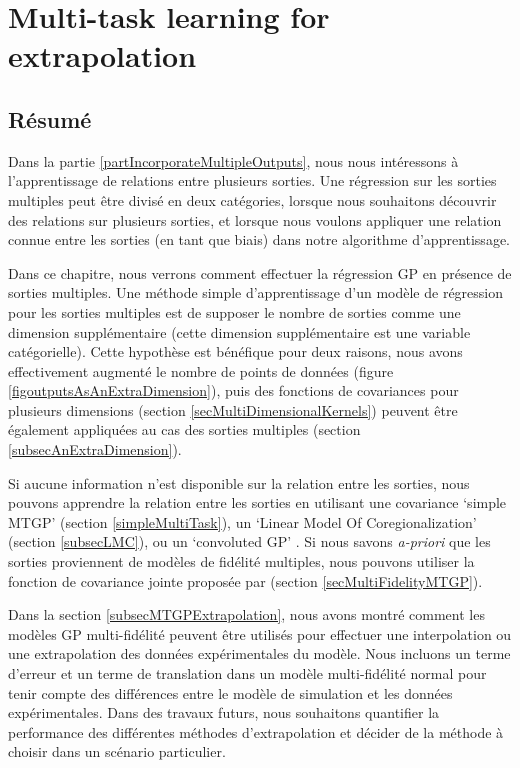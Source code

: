 \chapter{Multi-task learning for extrapolation}
\label{chapMultiTaskExtrapolation}

\begin{mdframed}[hidealllines=true,backgroundcolor=lightgray!20]
\section*{Résumé}
Dans la partie \ref{partIncorporateMultipleOutputs}, nous nous intéressons à l'apprentissage de relations entre plusieurs sorties. Une régression sur les sorties multiples peut être divisé en deux catégories, lorsque nous souhaitons découvrir des relations sur plusieurs sorties, et lorsque nous voulons appliquer une relation connue entre les sorties (en tant que biais) dans notre algorithme d'apprentissage.

Dans ce chapitre, nous verrons comment effectuer la régression GP en présence de sorties multiples. Une méthode simple d'apprentissage d'un modèle de régression pour les sorties multiples est de supposer le nombre de sorties comme une dimension supplémentaire (cette dimension supplémentaire est une variable catégorielle). Cette hypothèse est bénéfique pour deux raisons, nous avons effectivement augmenté le nombre de points de données (figure \ref{figoutputsAsAnExtraDimension}), puis des fonctions de covariances pour plusieurs dimensions (section \ref{secMultiDimensionalKernels}) peuvent être également appliquées au cas des sorties multiples (section \ref{subsecAnExtraDimension}).

Si aucune information n'est disponible sur la relation entre les sorties, nous pouvons apprendre la relation entre les sorties en utilisant une covariance `simple MTGP’ (section \ref{simpleMultiTask}), un `Linear Model Of Coregionalization' (section \ref{subsecLMC}), ou un `convoluted GP’ \cite{alvarez2011kernels}. Si nous savons \textit{a-priori} que les sorties proviennent de modèles de fidélité multiples, nous pouvons utiliser la fonction de covariance jointe proposée par \cite{kennedy2000predicting} (section \ref{secMultiFidelityMTGP}).

Dans la section \ref{subsecMTGPExtrapolation}, nous avons montré comment les modèles GP multi-fidélité peuvent être utilisés pour effectuer une interpolation ou une extrapolation des données expérimentales du modèle. Nous incluons un terme d'erreur et un terme de translation dans un modèle multi-fidélité normal pour tenir compte des différences entre le modèle de simulation et les données expérimentales. Dans des travaux futurs, nous souhaitons quantifier la performance des différentes méthodes d'extrapolation et décider de la méthode à choisir dans un scénario particulier.
\end{mdframed}


